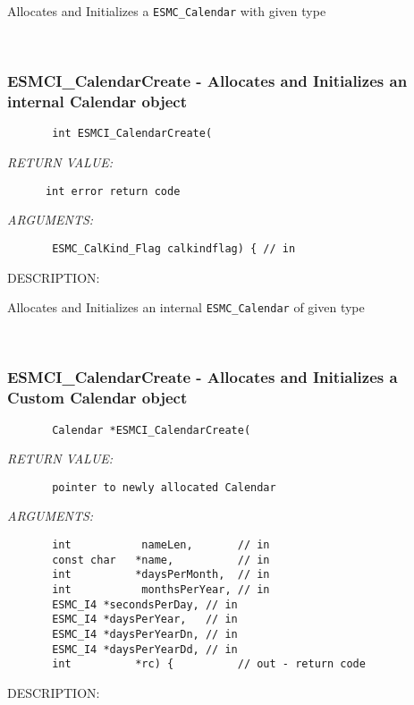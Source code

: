        Allocates and Initializes a {\tt ESMC\_Calendar} with given type
   
 
\mbox{}\hrulefill\ 
 
\subsubsection [ESMCI\_CalendarCreate] {ESMCI\_CalendarCreate - Allocates and Initializes an internal Calendar object}


  
\begin{verbatim}       int ESMCI_CalendarCreate(\end{verbatim}{\em RETURN VALUE:}
\begin{verbatim}      int error return code\end{verbatim}{\em ARGUMENTS:}
\begin{verbatim}       ESMC_CalKind_Flag calkindflag) { // in
 \end{verbatim}
{\sf DESCRIPTION:\\ }


        Allocates and Initializes an internal {\tt ESMC\_Calendar} of given type
   
 
\mbox{}\hrulefill\ 
 
\subsubsection [ESMCI\_CalendarCreate] {ESMCI\_CalendarCreate - Allocates and Initializes a Custom Calendar object}


  
\begin{verbatim}       Calendar *ESMCI_CalendarCreate(\end{verbatim}{\em RETURN VALUE:}
\begin{verbatim}       pointer to newly allocated Calendar\end{verbatim}{\em ARGUMENTS:}
\begin{verbatim}       int           nameLen,       // in
       const char   *name,          // in
       int          *daysPerMonth,  // in
       int           monthsPerYear, // in  
       ESMC_I4 *secondsPerDay, // in
       ESMC_I4 *daysPerYear,   // in
       ESMC_I4 *daysPerYearDn, // in
       ESMC_I4 *daysPerYearDd, // in
       int          *rc) {          // out - return code
 \end{verbatim}
{\sf DESCRIPTION:\\ }


